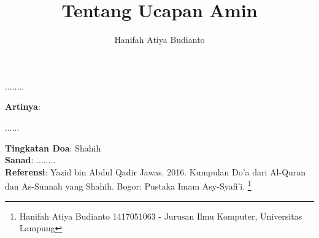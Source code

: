 \documentclass[a4paper,12pt]{article}
\title{\Large Tentang Ucapan Amin}
\author{\calligra Hanifah Atiya Budianto}
\begin{document}
\sffamily
\maketitle 
\fullvocalize
{}
\begin{arabtext}
\noindent
........\\
\end{arabtext}
\noindent
\textbf{Artinya}:
\par
\indent
......\\
\par
\noindent
\textbf{Tingkatan Doa}: Shahih \\
\textbf{Sanad}: ........\\
\textbf{Referensi}: Yazid bin Abdul Qadir Jawas. 2016. Kumpulan Do'a dari
Al-Quran dan As-Sunnah yang Shahih. Bogor: Pustaka Imam Asy-Syafi'i.
\footnote{Hanifah Atiya Budianto 1417051063 - Jurusan Ilmu Komputer,
Universitas Lampung}
\end{document}
